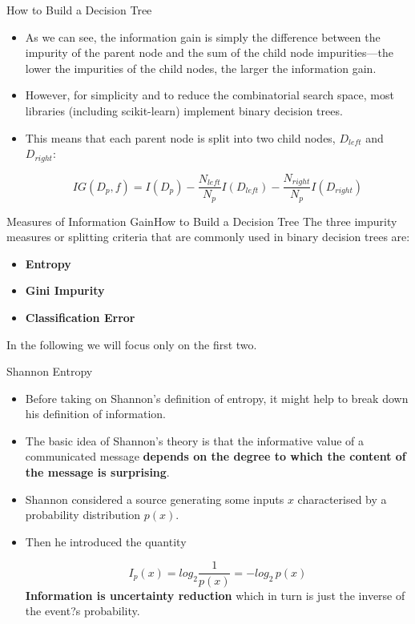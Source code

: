 \documentclass[11pt]{beamer}
\begin{document}
%
%
\begin{frame}{How to Build a Decision Tree}
\begin{itemize}
\item As we can see, the information gain is simply the difference between the impurity of the parent
node and the sum of the child node impurities—the lower the impurities of the child
nodes, the larger the information gain. 

\item However, for simplicity and to reduce the
combinatorial search space, most libraries (including scikit-learn) implement binary
decision trees. 

\item This means that each parent node is split into two child nodes, $D_{left}$
and $D_{right}$:

\begin{equation}
IG(D_p, f) = I(D_p) - \frac{N_{left}}{N_p}I(D_{left}) -
\frac{N_{right}}{N_p} I(D_{right})
\end{equation}
\end{itemize}
\end{frame}
%
%
\begin{frame}{Measures of Information Gain}{How to Build a Decision Tree}
The three impurity measures or splitting criteria that are commonly used in binary decision trees are: 
\begin{itemize}
\item \textbf{Entropy}
\item \textbf{Gini Impurity}
\item \textbf{Classification Error} 
\end{itemize}
In the following we will focus only on the first two.
\end{frame}
%
%
\begin{frame}{Shannon Entropy}
	\begin{itemize}
		\item Before taking on Shannon's definition of entropy, it might help to break down his definition of information. 
		\item The basic idea of Shannon's theory is that the informative value of a communicated message \textbf{depends on the degree to which the content of the message is surprising}. 
		\item Shannon considered a source generating some inputs $x$ characterised by a probability distribution $p(x)$. 
		
		\item Then he introduced the quantity

\begin{equation}
I_p(x) = log_2 \frac{1}{p(x)} = - log_2 \,p(x)
\end{equation}
\textbf{Information is uncertainty reduction} which in turn is just the inverse of the event?s probability.
	\end{itemize}
\end{frame}
\end{document}
